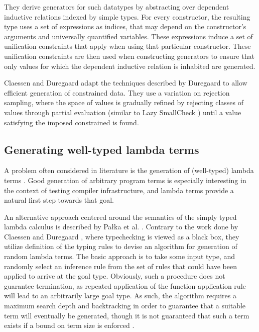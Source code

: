 \documentclass[a4paper,msc,twosized=semi]{uustthesis}
\begin{document}
  They derive generators for such datatypes by abstracting over dependent inductive 
  relations indexed by simple types. For every constructor, the resulting type uses a 
  set of expressions as indices, that may depend on the constructor's arguments and 
  universally quantified variables. These expressions induce a set of unification 
  constraints that apply when using that particular constructor. These unification 
  constraints are then used when constructing generators to ensure that only values 
  for which the dependent inductive relation is inhabited are generated. 

  Claessen and Duregaard \cite{claessen2015generating} adapt the techniques described 
  by Duregaard \cite{duregaard2013feat} to allow efficient generation of constrained 
   data. They use a variation on rejection sampling, where the space of values is 
  gradually refined by rejecting classes of values through partial evaluation 
  (similar to Lazy SmallCheck \cite{runciman2008smallcheck}) until a value satisfying 
  the imposed constrained is found. 

\subsection{Generating well-typed lambda terms}

  A problem often considered in literature is the generation of (well-typed) lambda 
  terms \cite{palka2011testing, grygiel2013counting, claessen2015generating}. Good 
  generation of arbitrary program terms is especially interesting in the context of 
  testing compiler infrastructure, and lambda terms provide a natural first step 
  towards that goal. 

  An alternative approach centered around the semantics of the simply typed lambda 
  calculus is described by Pa{\l}ka et al. \cite{palka2011testing}. Contrary to the 
  work done by Claessen and Duregaard \cite{claessen2015generating}, where 
  typechecking is viewed as a black box, they utilize definition of the typing rules 
  to devise an algorithm for generation of random lambda terms. The basic approach is 
  to take some input type, and randomly select an inference rule from the set of rules 
  that could have been applied to arrive at the goal type. Obviously, such a procedure 
  does not guarantee termination, as repeated application of the function application 
  rule will lead to an arbitrarily large goal type. As such, the algorithm requires a 
  maximum search depth and backtracking in order to guarantee that a suitable term 
  will eventually be generated, though it is not guaranteed that such a term exists if 
  a bound on term size is enforced \cite{moczurad2000statistical}. 
\end{document}
